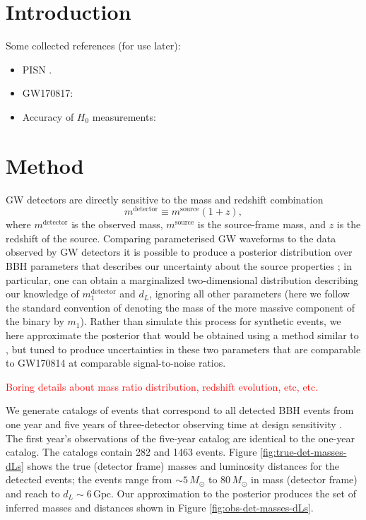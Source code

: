 \documentclass[modern]{aastex62}
\newcommand{\fixme}[1]{\textcolor{red}{#1}}
\newcommand{\mdet}{m^\mathrm{detector}}
\newcommand{\monedet}{m_1^\mathrm{detector}}
\newcommand{\msource}{m^\mathrm{source}}
\newcommand{\None}{282}
\newcommand{\Nfive}{1463}
\newcommand{\Gpc}{\mathrm{Gpc}}
\newcommand{\MSun}{M_\odot}
\begin{document}
\section{Introduction}

Some collected references (for use later):

\begin{itemize}
  \item \ac{PISN} \cite{Heger2002,Belczynski2016,Woosley2017,Spera2017}.
  \item GW170817: \cite{GW170817,GW170817-H0}
  \item Accuracy of $H_0$ measurements: \cite{GW170817-H0,Chen2017}
\end{itemize}

\section{Method}
\label{sec:method}

\Ac{GW} detectors are directly sensitive to the mass and redshift combination
%
\begin{equation}
  \label{eq:Mdet-definition}
  \mdet \equiv \msource \left( 1 + z \right),
\end{equation}
%
where $\mdet$ is the observed mass, $\msource$ is the source-frame mass, and $z$
is the redshift of the source.  Comparing parameterised \ac{GW} waveforms
\citep[e.g.][]{Taracchini2014,Bohe2017,Smith2016,Kahn2016,Chatziioannou2017} to
the data observed by \ac{GW} detectors it is possible to produce a posterior
distribution over \ac{BBH} parameters that describes our uncertainty about the
source properties \citep{Veitch2015,GW150914-PE}; in particular, one can obtain
a marginalized two-dimensional distribution describing our knowledge of
$\monedet$ and $d_L$, ignoring all other parameters (here we follow the standard
convention of denoting the mass of the more massive component of the binary by
$m_1$).  Rather than simulate this process for synthetic events, we here
approximate the posterior that would be obtained using a method similar to
\citet{Fishbach2018}, but tuned to produce uncertainties in these two parameters
that are comparable to GW170814 \citep{GW170814} at comparable signal-to-noise
ratios.

\fixme{Boring details about mass ratio distribution, redshift evolution, etc,
etc.}

We generate catalogs of events that correspond to all detected \ac{BBH} events
from one year and five years of three-detector observing time at design
sensitivity \citep{AdvancedLIGO,AdvancedVIRGO}.  The first year's observations
of the five-year catalog are identical to the one-year catalog. The catalogs
contain \None{} and \Nfive{} events.  Figure \ref{fig:true-det-masses-dLs} shows
the true (detector frame) masses and luminosity distances for the detected
events; the events range from $\sim 5 \, \MSun$ to $80 \, \MSun$ in mass
(detector frame) and reach to $d_L \sim 6 \, \Gpc$.  Our approximation to the
posterior produces the set of inferred masses and distances shown in Figure
\ref{fig:obs-det-masses-dLs}.
\end{document}
